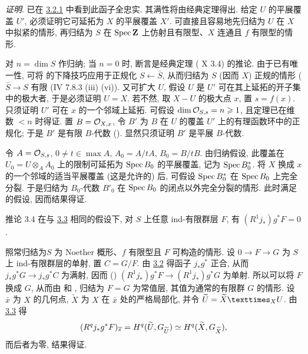 \noindent
\emph{证明}. 已在 \hyperref[XVI.cor3.2.1]{3.2.1} 中看到此函子全忠实. 其满性将由经典定理得出. 给定 $U$ 的平展覆盖 $U'$, 必须证明它可延拓为 $X$ 的平展覆盖 $X'$. 可直接且容易地先归结为 $U$ 在 $X$ 中拟紧的情形, 再归结为 $S$ 在 $\operatorname{Spec} \mathbf{Z}$ 上仿射且有限型、$X$ 连通且 $f$ 有限型的情形.

对 $n=\dim S$ 作归纳\pageoriginale; 当 $n=0$ 时, 断言是经典定理 ( X 3.4) 的推论. 由于已有唯一性, 可将  的下降技巧应用于正规化 $S\leftarrow \bar{S}$, 从而归结为 $S$ (因而 $X$) 正规的情形 ($\bar{S}\rightarrow S$ 有限 (\EGA IV 7.8.3 (iii) (vi)). 又可扩大 $U$, 假设 $U$ 是 $U'$ 可在其上延拓的开子集中的极大者, 于是必须证明 $U=X$. 若不然, 取 $X-U$ 的极大点 $x$, 置 $s=f(x)$. 只须证明 $U'$ 可在 $x$ 的一个邻域上延拓. 可假设 $\dim {\mathcal O}_{S,s}=n\geqslant 1$, 且定理已在维数 $<n$ 时得证. 置 $B={\mathcal O}_{X,x}$, 令 $B'$ 为 $B$ 在 $U$ 的覆盖 $U'$ 上的有理函数环中的正规化; 于是 $B'$ 是有限 $B$-代数 (\loccit). 显然只须证明 $B'$ 是平展 $B$-代数.

令 $A={\mathcal O}_{S,s}$, $0\neq t\in \max A$, $A_{0}=A/tA$, $B_{0}=B/tB$. 由归纳假设, 此覆盖在 $U_{0}=U\otimes_A A_{0}$ 上的限制可延拓为 $\operatorname{Spec} B_{0}$ 的平展覆盖, 记为 $\operatorname{Spec} B^{\ast}_{0}$. 将 $X$ 换成 $x$ 的一个邻域的适当平展覆盖 (这是允许的) 后, 可假设 $\operatorname{Spec} B^{\ast}_{0}$ 在 $\operatorname{Spec} B_{0}$ 上完全分裂. 于是归结为 $B_{0}$-代数 $B'_{0}$ 在 $\operatorname{Spec} B_{0}$ 的闭点以外完全分裂的情形. 此时满足  的假设, 因而结果得证.

\begin{enonce*}{推论 3.4}
在与 \hyperref[XVI.thm3.3]{3.3} 相同的假设下, 对 $S$ 上任意 ind-有限群层 $F$, 有 $(R^{1}j_{\ast})g^{\ast}F=0$.
\end{enonce*}

照常归结为\pageoriginale $S$ 为 Noether 概形、$f$ 有限型且 $F$ 可构造的情形. 设 $0\rightarrow F\rightarrow G$ 为 $S$ 上 ind-有限群层的单射, 置 $C=G/F$. 由 \hyperref[XVI.prop3.2]{3.2} 得函子 $j_{\ast}g^{\ast}$ 正合, 从而 $j_{\ast}g^{\ast}G\rightarrow j_{\ast}g^{\ast}C$ 为满射, 因而 () $(R^{1}j_{\ast})g^{\ast}F\rightarrow (R^{1}j_{\ast})g^{\ast}G$ 为单射. 所以可以将 $F$ 换成 $G$, 从而由  和 , 归结为 $F=G$ 为常值层, 其值为通常的有限群 $G$ 的情形.
设 $\bar{x}$ 为 $X$ 的几何点, $\widetilde{X}$ 为 $X$ 在 $\bar{x}$ 处的严格局部化, 并令 $\widetilde{U}=\fprod{\widetilde{X}}{U}{X}$. 由 \hyperref[XVI.thm3.3]{3.3} 得
$$
(R^{q}j_{\ast}g^{\ast}F)_{\overline{x}}=H^{q}(\widetilde{U},G_{\widetilde{U}})\simeq
H^{q}(\widetilde{X},G_{\widetilde{X}}){},
$$
而后者为零, 结果得证.

